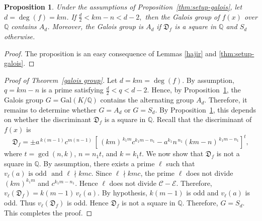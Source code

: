 \documentclass[table]{amsart}
\newtheorem{proposition}[theorem]{Proposition}
\newcommand{\D}{\mathfrak{D}}
\newcommand{\calC}{\mathcal{C}}
\newcommand{\calE}{\mathcal{E}}
\numberwithin{equation}{section}
\begin{document}
\begin{proposition}\label{cor:SnAn}
Under the assumptions of Proposition~\ref{thm:setup-galois}, let $d=\deg(f)=km$. If $\frac{d}{2} < km-n < d-2,$
then the Galois group of $f(x)$ over $\mathbb{Q}$ contains $A_{d}$. Moreover, the Galois group is $A_{d}$ if $\D_f$ is a square in $\mathbb{Q}$ and $S_{d}$ otherwise.
\end{proposition}
\begin{proof}
    The proposition is an easy consequence of Lemmas \ref{hajir} and \ref{thm:setup-galois}.
\end{proof}
\begin{proof}[Proof of Theorem~\ref{galois group}]
Let $d=km=\deg(f)$. By assumption, $q=km-n$ is a prime satisfying $\frac{d}{2} < q < d-2.$ Hence, by Proposition~\ref{cor:SnAn}, the Galois group $G=\mathrm{Gal}(K/\mathbb{Q})$ contains the alternating group $A_d$.
Therefore, it remains to determine whether $G=A_d$ or $G=S_d$.
By Proposition~\ref{cor:SnAn}, this depends on whether the discriminant
$\D_f$ is a square in $\mathbb{Q}$. Recall that the discriminant of $f(x)$ is
\[
\D_f
=\pm
a^{\,k(m-1)}c^{m(n-1)}\,
\left[\,(km)^{\,k_1m}c^{k_1m-n_1}
      - a^{k_1}n^{\,n_1}(km-n)^{\,k_1m-n_1}
\right]^{t},
\]
where $t=\gcd(n,k)$, $n=n_1t$, and $k=k_1t$. We now show that $\D_f$ is not a square in $\mathbb{Q}$. By assumption, there exists a prime $\ell$ such that $v_\ell(a) \text{ is odd } \text{ and }
\ell\nmid kmc.$ Since $\ell\nmid kmc$, the prime $\ell$ does not divide $(km)^{k_1m}$ and $
c^{k_1m-n_1}$. Hence $\ell$ does not divide $\calC-\calE$. Therefore, $v_\ell(\D_f) = k(m-1)\,v_\ell(a).$ By hypothesis, $k(m-1)$ is odd and $v_\ell(a)$ is odd. Thus $v_\ell(\D_f)$ is odd. Hence $\D_f$ is not a square in $\mathbb{Q}$. Therefore, $G=S_d.$ This completes the proof.
\end{proof}
\end{document}
